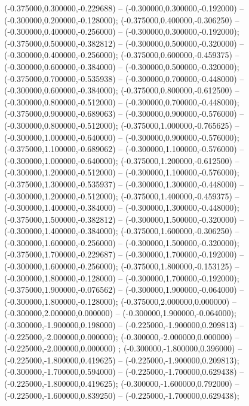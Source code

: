  (-0.375000,0.300000,-0.229688) -- (-0.300000,0.300000,-0.192000) -- (-0.300000,0.200000,-0.128000);
 (-0.375000,0.400000,-0.306250) -- (-0.300000,0.400000,-0.256000) -- (-0.300000,0.300000,-0.192000);
 (-0.375000,0.500000,-0.382812) -- (-0.300000,0.500000,-0.320000) -- (-0.300000,0.400000,-0.256000);
 (-0.375000,0.600000,-0.459375) -- (-0.300000,0.600000,-0.384000) -- (-0.300000,0.500000,-0.320000);
 (-0.375000,0.700000,-0.535938) -- (-0.300000,0.700000,-0.448000) -- (-0.300000,0.600000,-0.384000);
 (-0.375000,0.800000,-0.612500) -- (-0.300000,0.800000,-0.512000) -- (-0.300000,0.700000,-0.448000);
 (-0.375000,0.900000,-0.689063) -- (-0.300000,0.900000,-0.576000) -- (-0.300000,0.800000,-0.512000);
 (-0.375000,1.000000,-0.765625) -- (-0.300000,1.000000,-0.640000) -- (-0.300000,0.900000,-0.576000);
 (-0.375000,1.100000,-0.689062) -- (-0.300000,1.100000,-0.576000) -- (-0.300000,1.000000,-0.640000);
 (-0.375000,1.200000,-0.612500) -- (-0.300000,1.200000,-0.512000) -- (-0.300000,1.100000,-0.576000);
 (-0.375000,1.300000,-0.535937) -- (-0.300000,1.300000,-0.448000) -- (-0.300000,1.200000,-0.512000);
 (-0.375000,1.400000,-0.459375) -- (-0.300000,1.400000,-0.384000) -- (-0.300000,1.300000,-0.448000);
 (-0.375000,1.500000,-0.382812) -- (-0.300000,1.500000,-0.320000) -- (-0.300000,1.400000,-0.384000);
 (-0.375000,1.600000,-0.306250) -- (-0.300000,1.600000,-0.256000) -- (-0.300000,1.500000,-0.320000);
 (-0.375000,1.700000,-0.229687) -- (-0.300000,1.700000,-0.192000) -- (-0.300000,1.600000,-0.256000);
 (-0.375000,1.800000,-0.153125) -- (-0.300000,1.800000,-0.128000) -- (-0.300000,1.700000,-0.192000);
 (-0.375000,1.900000,-0.076562) -- (-0.300000,1.900000,-0.064000) -- (-0.300000,1.800000,-0.128000);
 (-0.375000,2.000000,0.000000) -- (-0.300000,2.000000,0.000000) -- (-0.300000,1.900000,-0.064000);
 (-0.300000,-1.900000,0.198000) -- (-0.225000,-1.900000,0.209813) -- (-0.225000,-2.000000,0.000000);
 (-0.300000,-2.000000,0.000000) -- (-0.225000,-2.000000,0.000000) ;
 (-0.300000,-1.800000,0.396000) -- (-0.225000,-1.800000,0.419625) -- (-0.225000,-1.900000,0.209813);
 (-0.300000,-1.700000,0.594000) -- (-0.225000,-1.700000,0.629438) -- (-0.225000,-1.800000,0.419625);
 (-0.300000,-1.600000,0.792000) -- (-0.225000,-1.600000,0.839250) -- (-0.225000,-1.700000,0.629438);
